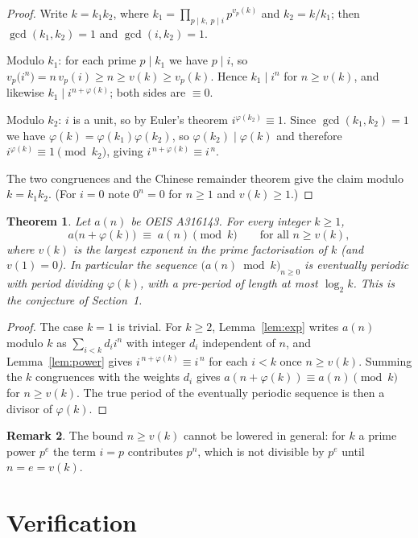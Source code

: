\documentclass[11pt,a4paper]{article}
\theoremstyle{plain}
\newtheorem{theorem}{Theorem}
\theoremstyle{definition}
\newtheorem{remark}[theorem]{Remark}
\begin{document}
\begin{proof}
Write $k=k_1k_2$, where $k_1=\prod_{p\mid k,\ p\mid i}p^{v_p(k)}$ and $k_2=k/k_1$; then
$\gcd(k_1,k_2)=1$ and $\gcd(i,k_2)=1$.

Modulo $k_1$: for each prime $p\mid k_1$ we have $p\mid i$, so
$v_p\bigl(i^{n}\bigr)=n\,v_p(i)\ge n\ge v(k)\ge v_p(k)$. Hence $k_1\mid i^{n}$ for
$n\ge v(k)$, and likewise $k_1\mid i^{n+\varphi(k)}$; both sides are $\equiv 0$.

Modulo $k_2$: $i$ is a unit, so by Euler's theorem $i^{\varphi(k_2)}\equiv 1$. Since
$\gcd(k_1,k_2)=1$ we have $\varphi(k)=\varphi(k_1)\varphi(k_2)$, so
$\varphi(k_2)\mid\varphi(k)$ and therefore $i^{\varphi(k)}\equiv 1 \pmod{k_2}$, giving
$i^{\,n+\varphi(k)}\equiv i^{\,n}$.

The two congruences and the Chinese remainder theorem give the claim modulo $k=k_1k_2$.
(For $i=0$ note $0^{n}=0$ for $n\ge 1$ and $v(k)\ge1$.)
\end{proof}

\begin{theorem}\label{thm:main}
Let $a(n)$ be OEIS A316143. For every integer $k\ge1$,
\[
a\bigl(n+\varphi(k)\bigr)\;\equiv\;a(n)\pmod{k}\qquad\text{for all } n\ge v(k),
\]
where $v(k)$ is the largest exponent in the prime factorisation of $k$ (and $v(1)=0$).
In particular the sequence $\bigl(a(n)\bmod k\bigr)_{n\ge0}$ is eventually periodic with
period dividing $\varphi(k)$, with a pre-period of length at most $\log_2 k$. This is the
conjecture of Section~1.
\end{theorem}

\begin{proof}
The case $k=1$ is trivial. For $k\ge2$, Lemma~\ref{lem:exp} writes $a(n)$ modulo $k$ as
$\sum_{i<k}d_i i^{n}$ with integer $d_i$ independent of $n$, and Lemma~\ref{lem:power}
gives $i^{\,n+\varphi(k)}\equiv i^{\,n}$ for each $i<k$ once $n\ge v(k)$. Summing the
$k$ congruences with the weights $d_i$ gives
$a(n+\varphi(k))\equiv a(n)\pmod k$ for $n\ge v(k)$. The true period of the eventually
periodic sequence is then a divisor of $\varphi(k)$.
\end{proof}

\begin{remark}
The bound $n\ge v(k)$ cannot be lowered in general: for $k$ a prime power $p^{e}$ the
term $i=p$ contributes $p^{n}$, which is not divisible by $p^{e}$ until $n=e=v(k)$.
\end{remark}

\section{Verification}
\end{document}
